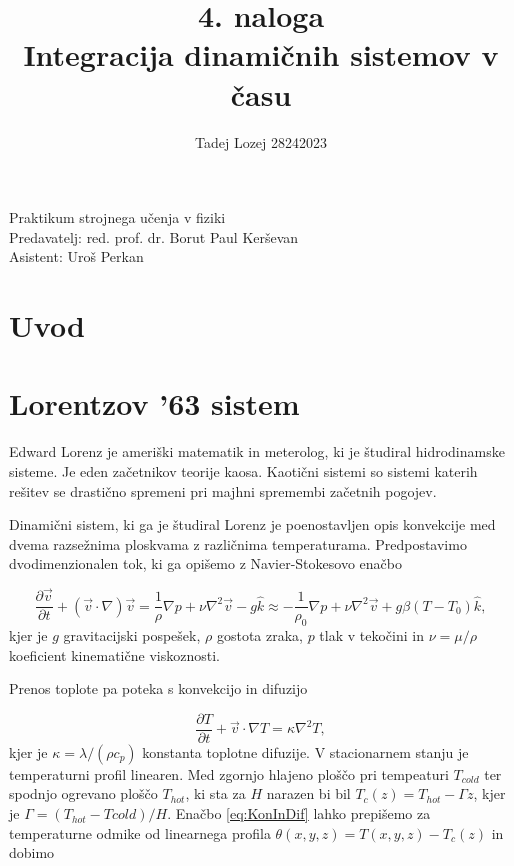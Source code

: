 \documentclass[slovene,11pt,a4paper]{article}
\begin{document}
\title{4. naloga \\ Integracija dinamičnih sistemov v času}
\author{Tadej Lozej 28242023}
\maketitle

\begin{center}
Praktikum strojnega učenja v fiziki \\
\bigskip
Predavatelj: red. prof. dr. Borut Paul Kerševan \\
Asistent: Uroš Perkan
\end{center}

\newpage

\tableofcontents

\newpage


\section{Uvod}

\section{Lorentzov '63 sistem}

Edward Lorenz je ameriški matematik in meterolog, ki je študiral hidrodinamske sisteme. Je eden začetnikov teorije kaosa. Kaotični sistemi so sistemi katerih rešitev se drastično spremeni pri majhni spremembi začetnih pogojev.

Dinamični sistem, ki ga je študiral Lorenz je poenostavljen opis konvekcije med dvema razsežnima ploskvama z različnima temperaturama. Predpostavimo dvodimenzionalen tok, ki ga opišemo z Navier-Stokesovo enačbo

\begin{equation}
    \frac{\partial \vec{v}}{\partial t} + (\vec{v} \cdot \nabla) \vec{v} = \frac{1}{\rho} \nabla p + \nu \nabla^2 \vec{v} - g \hat{k} \approx -\frac{1}{\rho_0} \nabla p + \nu \nabla^2 \vec{v} + g \beta (T-T_0) \hat{k},
\end{equation}
kjer je $g$ gravitacijski pospešek, $\rho$ gostota zraka, $p$ tlak v tekočini in $\nu = \mu / \rho$ koeficient kinematične viskoznosti.

Prenos toplote pa poteka s konvekcijo in difuzijo

\begin{equation}
    \frac{\partial T}{\partial t} + \vec{v} \cdot \nabla T = \kappa \nabla^2 T,
    \label{eq:KonInDif}
\end{equation}
kjer je $\kappa = \lambda / (\rho c_p)$ konstanta toplotne difuzije. V stacionarnem stanju je temperaturni profil linearen. Med zgornjo hlajeno ploščo pri tempeaturi $T_{cold}$ ter spodnjo ogrevano ploščo $T_{hot}$, ki sta za $H$ narazen bi bil $T_c(z) = T_{hot} - \Gamma z$, kjer je $\Gamma = (T_{hot} - T{cold}) / H$. Enačbo \ref{eq:KonInDif} lahko prepišemo za temperaturne odmike od linearnega profila $\theta (x, y, z) = T(x, y, z) - T_c(z)$ in dobimo
\end{document}

